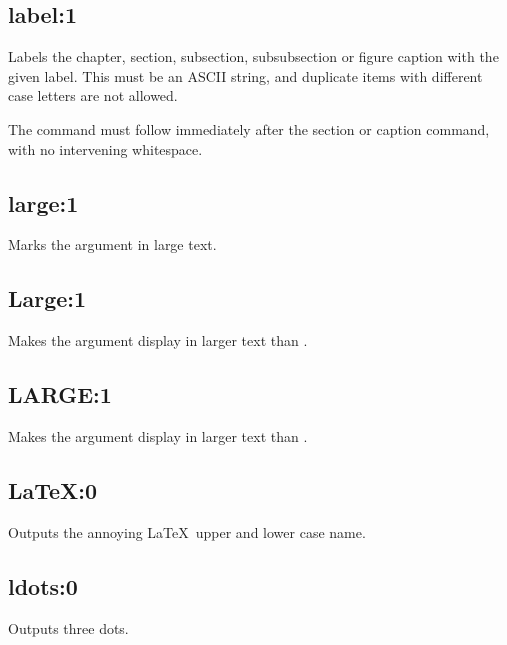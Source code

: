 \subsection*{label:1}\label{label}

Labels the chapter, section, subsection, subsubsection or figure caption
with the given label. This must be an ASCII string, and duplicate items
with different case letters are not allowed.

The command must follow immediately after the section or caption command,
with no intervening whitespace.

\subsection*{large:1}\label{large1}

Marks the argument in large text.

\subsection*{Large:1}\label{Large2}

Makes the argument display in larger text than .

\subsection*{LARGE:1}\label{LARGE3}

Makes the argument display in larger text than .

\subsection*{LaTeX:0}\label{LaTeX}

Outputs the annoying \LaTeX\ upper and lower case name.

\subsection*{ldots:0}\label{ldots}

Outputs three dots.

